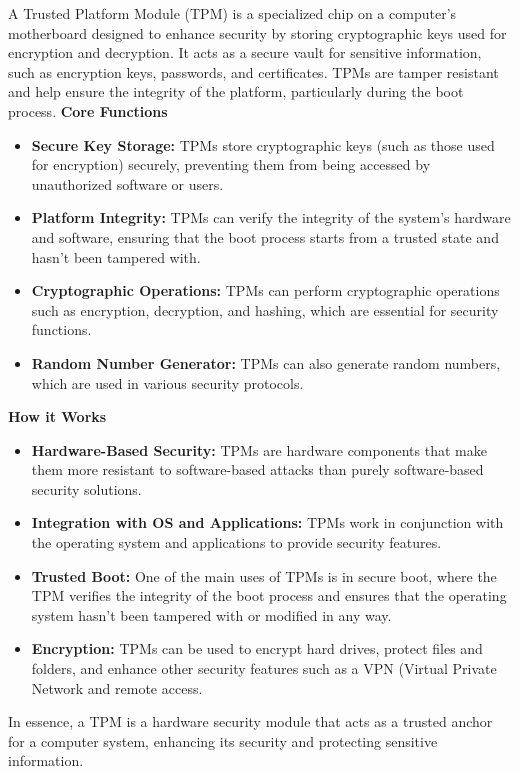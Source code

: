  A Trusted Platform Module (TPM) is a specialized chip on a computer's motherboard designed to enhance security by storing cryptographic keys used for encryption and decryption. It acts as a secure vault for sensitive information, such as encryption keys, passwords, and certificates. TPMs are tamper resistant and help ensure the integrity of the platform, particularly during the boot process.
\textbf{Core Functions}
\begin{itemize}
    \item \textbf{Secure Key Storage:} TPMs store cryptographic keys (such as those used for encryption) securely, preventing them from being accessed by unauthorized software or users.
    \item \textbf{Platform Integrity:} TPMs can verify the integrity of the system's hardware and software, ensuring that the boot process starts from a trusted state and hasn't been tampered with.
    \item \textbf{Cryptographic Operations:} TPMs can perform cryptographic operations such as  encryption, decryption, and hashing, which are essential for security functions.
    \item \textbf{Random Number Generator:} TPMs can also generate random numbers, which are used in various security protocols.
\end{itemize}
\textbf{How it Works}
\begin{itemize}
    \item \textbf{Hardware-Based Security:} TPMs are hardware components that make them more resistant to software-based attacks than purely software-based security solutions.
    \item \textbf{Integration with OS and Applications:} TPMs work in conjunction with the operating system and applications to provide security features.
    \item \textbf{Trusted Boot:} One of the main uses of TPMs is in secure boot, where the TPM verifies the integrity of the boot process and ensures that the operating system hasn't been tampered with or modified in any way.
    \item \textbf{Encryption:} TPMs can be used to encrypt hard drives, protect files and folders, and enhance other security features such as a VPN (Virtual Private Network and remote access.
\end{itemize}
In essence, a TPM is a hardware security module that acts as a trusted anchor for a computer system, enhancing its security and protecting sensitive information.

